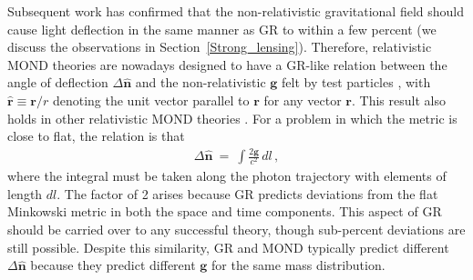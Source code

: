 \documentclass[fleqn,usenatbib,useAMS]{mnras} %
\begin{document}
Subsequent work has confirmed that the non-relativistic gravitational field should cause light deflection in the same manner as GR to within a few percent (we discuss the observations in Section~\ref{Strong_lensing}). Therefore, relativistic MOND theories are nowadays designed to have a GR-like relation between the angle of deflection $\Delta \widehat{\bm{n}}$ and the non-relativistic $\bm{g}$ felt by test particles \citep{Chiu_2006, Tian_2013}, with $\widehat{\bm{r}} \equiv \bm{r}/r$ denoting the unit vector parallel to $\bm{r}$ for any vector $\bm{r}$. This result also holds in other relativistic MOND theories \citep{Zlosnik_2007, Milgrom_2009_bimetric, Deffayet_2011, Milgrom_2019_nonlocal}. For a problem in which the metric is close to flat, the relation is that
\begin{eqnarray}
	\Delta \widehat{\bm{n}} ~=~ \int \frac{2 \bm{g}}{c^2} \, dl \, ,
	\label{Light_deflection_angle}
\end{eqnarray}
where the integral must be taken along the photon trajectory with elements of length $dl$. The factor of 2 arises because GR predicts deviations from the flat Minkowski metric in both the space and time components. This aspect of GR should be carried over to any successful theory, though sub-percent deviations are still possible. Despite this similarity, GR and MOND typically predict different $\Delta \widehat{\bm{n}}$ because they predict different $\bm{g}$ for the same mass distribution.

\end{document}
